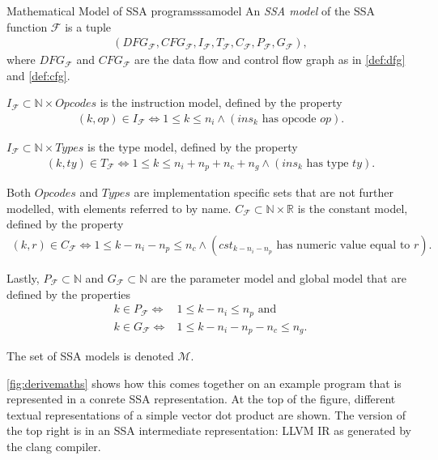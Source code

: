 \begin{definition}{Mathematical Model of SSA programs}{ssamodel}
    An {\em SSA model} of the SSA function $\mathcal F$ is a tuple
    \begin{align*}
        (DFG_\mathcal{F}, CFG_\mathcal{F},I_\mathcal{F},T_\mathcal{F},C_\mathcal{F},P_\mathcal{F},G_\mathcal{F}),
    \end{align*}
    where $DFG_\mathcal{F}$ and $CFG_\mathcal{F}$ are the data flow and control
    flow graph as in \autoref{def:dfg} and \autoref{def:cfg}.

    $I_\mathcal F\subset\mathbb N\times Opcodes$ is the instruction model, defined by the property
    \begin{align*}
        (k,op)\in I_\mathcal F\iff 1\leq k\leq n_i\land(ins_k\text{ has opcode }op).
    \end{align*}

    $I_\mathcal F\subset\mathbb N\times Types$ is the type model, defined by the property
    \begin{align*}
        (k,ty)\in T_\mathcal F\iff 1\leq k\leq n_i+n_p+n_c+n_g\land(ins_k\text{ has type }ty).
    \end{align*}

    Both $Opcodes$ and $Types$ are implementation specific sets that are not
    further modelled, with elements referred to by name.
    $C_\mathcal F\subset\mathbb N\times\mathbb R$ is the constant model, defined
    by the property
    \begin{align*}
        (k,r)\in C_\mathcal F\iff 1\leq k-n_i-n_p\leq n_c\land(cst_{k-n_i-n_p}\text{ has numeric value equal to }r).
    \end{align*}

    Lastly, $P_\mathcal F\subset\mathbb N$ and $G_\mathcal F\subset\mathbb N$
    are the parameter model and global model that are defined by the properties
    \begin{align*}
        k\in P_\mathcal F\iff& 1\leq k-n_i\leq n_p\text{ and}\\
        k\in G_\mathcal F\iff& 1\leq k-n_i-n_p-n_c\leq n_g.
    \end{align*}

    The set of SSA models is denoted $\mathcal M$.
\end{definition}

    \autoref{fig:derivemaths} shows how this comes together on an example
    program that is represented in a conrete SSA representation.
    At the top of the figure, different textual representations of a simple
    vector dot product are shown.
    The version of the top right is in an SSA intermediate representation: LLVM
    IR as generated by the clang compiler.

